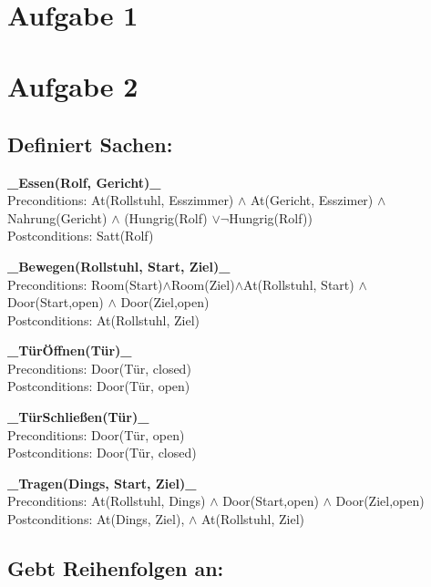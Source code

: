 \documentclass{../Vorlage/mat}
\begin{document}
 \\

\section*{Aufgabe 1}


\section*{Aufgabe 2}
\subsection*{Definiert Sachen:}
\textbf{\_Essen(Rolf, Gericht)\_}\\
Preconditions: At(Rollstuhl, Esszimmer) $\wedge$ At(Gericht, Esszimer) $\wedge$ Nahrung(Gericht) $\wedge$ (Hungrig(Rolf) $\vee \neg$Hungrig(Rolf))\\
Postconditions: Satt(Rolf)


\textbf{\_Bewegen(Rollstuhl, Start, Ziel)\_}\\
Preconditions: Room(Start)$\wedge$Room(Ziel)$\wedge$At(Rollstuhl, Start) $\wedge$  Door(Start,open) $\wedge$ Door(Ziel,open)\\
Postconditions: At(Rollstuhl, Ziel)


\textbf{\_TürÖffnen(Tür)\_}\\
Preconditions: Door(Tür, closed)\\
Postconditions: Door(Tür, open)


\textbf{\_TürSchließen(Tür)\_}\\
Preconditions: Door(Tür, open)\\
Postconditions: Door(Tür, closed)


\textbf{\_Tragen(Dings, Start, Ziel)\_}\\
Preconditions: At(Rollstuhl, Dings) $\wedge$  Door(Start,open) $\wedge$ Door(Ziel,open)\\
Postconditions: At(Dings, Ziel), $\wedge$ At(Rollstuhl, Ziel)

\subsection*{Gebt Reihenfolgen an:}
\end{document}
